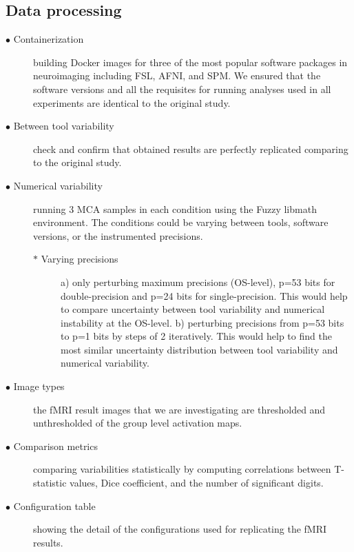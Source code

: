 \documentclass[runningheads]{llncs}
\begin{document}
\subsection{Data processing}

\begin{description}
  \item[$\bullet$ Containerization] building Docker images for three of the most popular software packages in neuroimaging including FSL, AFNI, and SPM.
                  We ensured that the software versions and all the requisites for running analyses used in all experiments 
                  are identical to the original study.  

  \item[$\bullet$ Between tool variability] check and confirm that obtained results are perfectly replicated comparing to the original study. 

  \item[$\bullet$ Numerical variability] running 3 MCA samples in each condition using the Fuzzy libmath environment. 
                  The conditions could be varying between tools, software versions, or the instrumented precisions. 
    \begin{description}
      \item[$\ast$ Varying precisions] a) only perturbing maximum precisions (OS-level), p=53 bits for double-precision and p=24 bits for single-precision.
                                       This would help to compare uncertainty between tool variability and numerical instability at the OS-level. 
                                       b) perturbing precisions from p=53 bits to p=1 bits by steps of 2 iteratively. 
                                       This would help to find the most similar uncertainty distribution between tool variability and numerical variability.
    \end{description}
    
  \item[$\bullet$ Image types] the fMRI result images that we are investigating are thresholded and unthresholded of the group level activation maps.

  \item[$\bullet$ Comparison metrics] comparing variabilities statistically by computing correlations between T-statistic values, Dice coefficient, 
                  and the number of significant digits.    

  \item[$\bullet$ Configuration table] showing the detail of the configurations used for replicating the fMRI results.
\end{description}
\end{document}
